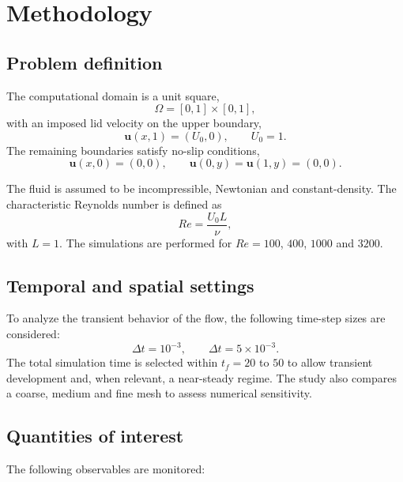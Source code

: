 \documentclass[10pt,twoside]{article}
\begin{document}
\section{Methodology}

\subsection{Problem definition}

The computational domain is a unit square,
\begin{equation}
\Omega = [0,1] \times [0,1],
\end{equation}
with an imposed lid velocity on the upper boundary,
\begin{equation}
\mathbf{u}(x,1) = (U_0, 0), \qquad U_0 = 1.
\end{equation}
The remaining boundaries satisfy no-slip conditions,
\begin{equation}
\mathbf{u}(x,0) = (0,0), \qquad \mathbf{u}(0,y) = \mathbf{u}(1,y) = (0,0).
\end{equation}

The fluid is assumed to be incompressible, Newtonian and constant-density. The characteristic Reynolds number is defined as
\begin{equation}
Re = \frac{U_0 L}{\nu},
\end{equation}
with $L=1$. The simulations are performed for $Re=100$, $400$, $1000$ and $3200$.

\subsection{Temporal and spatial settings}

To analyze the transient behavior of the flow, the following time-step sizes are considered:
\begin{equation}
\Delta t = 10^{-3}, \qquad \Delta t = 5\times10^{-3}.
\end{equation}
The total simulation time is selected within $t_f = 20$ to $50$ to allow transient development and, when relevant, a near-steady regime. The study also compares a coarse, medium and fine mesh to assess numerical sensitivity.

\subsection{Quantities of interest}

The following observables are monitored:
\end{document}

